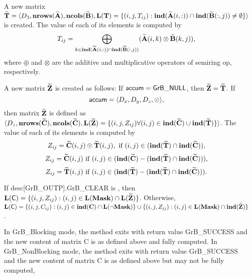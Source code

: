 A new matrix ${\bf \widetilde{T}} = \langle
D_3, \bold{nrows}({\bf \widetilde{A}}),
\bold{ncols}({\bf \widetilde{B}}), \bold{L}({\bf T}) =
\{(i,j,T_{ij}) : \bold{ind}({\bf \widetilde{A}}(i,:)) \cap
\bold{ind}({\bf \widetilde{B}}(:,j)) \neq \emptyset \} \rangle$
is created.  The value of each of its elements is computed by \[T_{ij}
= \bigoplus_{k \in \bold{ind}({\bf \widetilde{A}}(i,:)) \cap
\bold{ind}({\bf \widetilde{B}}(:,j))} ({\bf \widetilde{A}}(i,k)
\otimes {\bf \widetilde{B}}(k,j)),\] where $\oplus$ and $\otimes$
are the additive and multiplicative operators of semiring {\sf op},
respectively.

A new matrix ${\bf \widetilde{Z}}$ is created as follows:
If ${\sf accum} = {\sf GrB\_NULL}$, then ${\bf \widetilde{Z}} = {\bf \widetilde{T}}$.
If \[ {\sf accum} = \langle D_x, D_y, D_z, \odot \rangle, \] then matrix ${\bf \widetilde{Z}}$ is defined as $\langle D_z, \bold{nrows}({\bf \widetilde{C}}), \bold{ncols}({\bf \widetilde{C}}), \bold{L}({\bf \widetilde{Z}}) 
		= \{(i,j,Z_{ij})  \forall (i,j) \in \bold{ind}({\bf \widetilde{C}}) \cup \bold{ind}({\bf \widetilde{T}}) \} \rangle$.  The value of each of its
elements is computed by
\[
Z_{ij} = \matrix{\widetilde{C}}(i,j) \odot \matrix{\widetilde{T}}(i,j), \ \mbox{if}\  (i,j) \in  (\bold{ind}(\matrix{\widetilde{T}}) \cap \bold{ind}(\matrix{\widetilde{C}})),
\]
\[
Z_{ij} = \matrix{\widetilde{C}}(i,j) \ \mbox{if}\  (i,j) \in  (\bold{ind}(\matrix{\widetilde{C}}) - (\bold{ind}(\matrix{\widetilde{T}}) \cap \bold{ind}(\matrix{\widetilde{C}}))),
\]
\[
Z_{ij} = \matrix{\widetilde{T}}(i,j) \ \mbox{if}\  (i,j) \in  (\bold{ind}(\matrix{\widetilde{T}}) - (\bold{ind}(\matrix{\widetilde{T}}) \cap \bold{ind}(\matrix{\widetilde{C}}))).
\]

If {\sf desc[GrB\_OUTP].GrB\_CLEAR} is \true, then $\bold{L}({\sf C}) = \{(i,j,Z_{ij}) : (i,j) \in \bold{L}({\bf Mask}) \cap \bold{L}({\bf \widetilde{Z}}) \}$. Otherwise, $\bold{L}({\sf C}) = \{(i,j,C_{ij}) : (i,j) \in \bold{ind}({\bf C}) \cap \bold{L}(\neg {\bf Mask}) \} \cup \{(i,j,Z_{ij}) : (i,j) \in \bold{L}({\bf Mask}) \cap \bold{ind}({\bf \widetilde{Z}}) \} $.

In {\sf GrB\_Blocking} mode, the method exits with return value {\sf GrB\_SUCCESS} and the new content of matrix {\sf C} is as defined above and fully computed.
In {\sf GrB\_NonBlocking} mode, the method exits with return value {\sf GrB\_SUCCESS} and the new content of matrix {\sf C} is as defined above but may not be fully computed,

